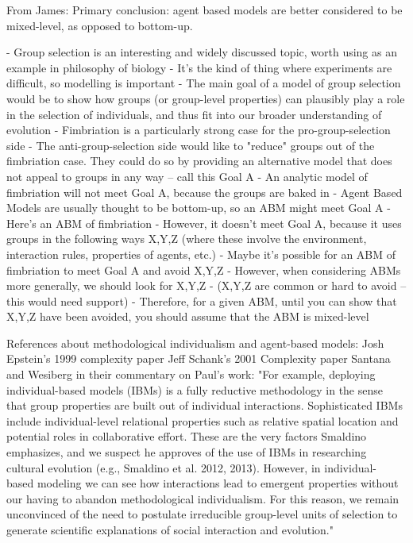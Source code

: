 \documentclass[11pt]{article}
\begin{document}
From James:
Primary conclusion: agent based models are better considered to be mixed-level, as opposed to bottom-up.

- Group selection is an interesting and widely discussed topic, worth using as an example in philosophy of biology
- It's the kind of thing where experiments are difficult, so modelling is important
- The main goal of a model of group selection would be to show how groups (or group-level properties) can plausibly play a role in the selection of individuals, and thus fit into our broader understanding of evolution
- Fimbriation is a particularly strong case for the pro-group-selection side
- The anti-group-selection side would like to "reduce" groups out of the fimbriation case. They could do so by providing an alternative model that does not appeal to groups in any way -- call this Goal A
- An analytic model of fimbriation will not meet Goal A, because the groups are baked in
- Agent Based Models are usually thought to be bottom-up, so an ABM might meet Goal A
- Here's an ABM of fimbriation
- However, it doesn't meet Goal A, because it uses groups in the following ways X,Y,Z (where these involve the environment, interaction rules, properties of agents, etc.)
- Maybe it's possible for an ABM of fimbriation to meet Goal A and avoid X,Y,Z
- However, when considering ABMs more generally, we should look for X,Y,Z
- (X,Y,Z are common or hard to avoid -- this would need support)
- Therefore, for a given ABM, until you can show that X,Y,Z have been avoided, you should assume that the ABM is mixed-level



References about methodological individualism and agent-based models:
Josh Epstein's 1999 complexity paper
Jeff Schank's 2001 Complexity paper
Santana and Wesiberg in their commentary on Paul's work: "For example, deploying individual-based models (IBMs) is a fully reductive methodology in the sense that group properties are built out of individual interactions. Sophisticated IBMs include individual-level relational properties such as relative spatial location and potential roles in collaborative effort. These are the very factors Smaldino emphasizes, and we suspect he approves of the use of IBMs in researching cultural evolution (e.g., Smaldino et al. 2012, 2013). However, in individual- based modeling we can see how interactions lead to emergent properties without our having to abandon methodological individualism. For this reason, we remain unconvinced of the need to postulate irreducible group-level units of selection to generate scientific explanations of social interaction and evolution."
\end{document}
